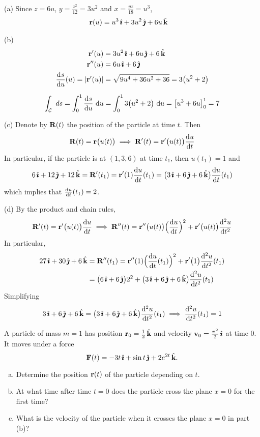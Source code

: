 \begin{solution}
(a) 
Since $z=6u$, $y=\frac{z^2}{12}=3u^2$ and $x=\frac{yz}{18}=u^3$,
\begin{align*}
\mathbf{r}(u)&=u^3\,\hat{\pmb{\imath}}+3u^2\,\hat{\pmb{\jmath}}+6u\,\hat{\mathbf{k}}
\end{align*}

(b)
\begin{align*}
\vr'(u)&=3u^2\,\hi+6u\,\hj+6\,\hk\\
\vr''(u)&=6u\,\hi+6\,\hj\\
\diff{s}{u}(u)=|\vr'(u)|
&=\sqrt{9u^4+36u^2+36}=3\big(u^2+2\big)\\
\end{align*}


$$
\int_\cC \ ds
=\int_0^1 \diff{s}{u}\ \dee{u}
=\int_0^1 3\big(u^2+2\big)\ \dee{u}
=\big[u^3+6u\big]_0^1
=7
$$

(c) Denote by $\mathbf{R}(t)$ the position of the particle at time $t$.
Then
$$
\vR(t)=\vr\big(u(t)\big)\implies
\vR'(t)=\vr'\big(u(t)\big)\diff{u}{t}
$$
In particular, if the particle is at $(1,3,6)$ at time $t_1$, then $u(t_1)=1$
and
$$
6\,\hi+12\,\hj+12\,\hk=\vR'(t_1)=\vr'(1)\diff{u}{t}(t_1)
=\big(3\,\hi+6\,\hj+6\,\hk\big)\diff{u}{t}(t_1)
$$
which implies that $\diff{u}{t}(t_1)=2$.

(d) By the product and chain rules,
$$
\vR'(t)=\vr'\big(u(t)\big)\diff{u}{t}\implies
\vR''(t)=\vr''\big(u(t)\big)\Big(\diff{u}{t}\Big)^2
+\vr'\big(u(t)\big)\difftwo{u}{t}
$$
In particular,
\begin{align*}
27\,\hi+30\,\hj+6\,\hk
&=\vR''(t_1)=\vr''(1)\Big(\diff{u}{t}(t_1)\Big)^2
+\vr'\big(1\big)\difftwo{u}{t}(t_1) \\
&=\big(6\,\hi+6\,\hj\big)2^2+\big(3\,\hi+6\,\hj+6\,\hk\big)\difftwo{u}{t}(t_1)
\end{align*}
Simplifying
$$
3\,\hi+6\,\hj+6\,\hk
=\big(3\,\hi+6\,\hj+6\,\hk\big)\difftwo{u}{t}(t_1)
\implies \difftwo{u}{t}(t_1)=1
$$
\end{solution}


\begin{question}[M317 2008A] %
A particle of mass $m = 1$ has position $\mathbf{r}_0 = \frac{1}{2}\,\hat{\mathbf{k}}$ 
and velocity $\mathbf{v}_0 =\frac{\pi^2}{2}\,\hat{\pmb{\imath}}$ at time $0$.
It moves under a force
\begin{equation*}
\mathbf{F}(t) = -3t\,\hat{\pmb{\imath}} + \sin t\,\hat{\pmb{\jmath}} + 2e^{2t}\,\hat{\mathbf{k}}.
\end{equation*}
\begin{enumerate}[(a)]
\item
Determine the position $\mathbf{r}(t)$ of the particle depending on $t$.
\item
At what time after time $t = 0$ does the particle cross the plane 
$x = 0$ for the first time?
\item
What is the velocity of the particle when it crosses the plane $x = 0$ 
in part (b)?
\end{enumerate}
\end{question}

